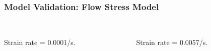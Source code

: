 \documentclass{beamer}
\begin{document}
    \begin{frame}
      \frametitle{Model Validation: Flow Stress Model}
      \begin{columns}[t]
        \begin{column}{5cm}
          \centering
           \\
          {\scriptsize Strain rate = 0.0001/s.}
        \end{column}
        \begin{column}{5cm}
          \centering
           \\
          {\scriptsize Strain rate = 0.0057/s.}
        \end{column}
      \end{columns}
    \end{frame}
\end{document}
